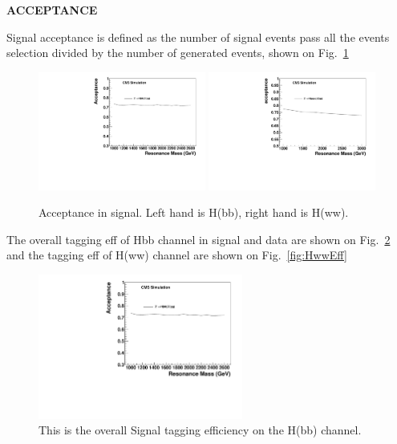 {\bf  ACCEPTANCE}

Signal acceptance is defined as the number of signal events pass all the events selection divided by the 
number of generated events, shown on Fig.~\ref{fig:Acc}

\begin{figure}[htb]
\begin{center}
\includegraphics[width=0.49\textwidth]{HbbZqqfigs/Signal/HbbZqq-signal-acc-8TeV.pdf}
\includegraphics[width=0.49\textwidth]{HqqqqZqqfigs/Signal/HqqqqZqq-signal-acc-8TeV.pdf}
\end{center}
\caption{
Acceptance in signal. Left hand is H(bb), right hand is H(ww).
}
\label{fig:Acc}
\end{figure}


The overall tagging eff of Hbb channel in signal and data are shown on Fig.~\ref{fig:HbbEff}
and the tagging eff of H(ww) channel are shown on Fig.~\ref{fig:HwwEff}


\begin{figure}[htb]
\begin{center}
\includegraphics[width=0.60\textwidth]{HbbZqqfigs/Signal/HbbZqq-signal-acc-8TeV.pdf}
\end{center}
\caption{
This is the overall Signal tagging efficiency on the H(bb) channel. 
}
\label{fig:HbbEff}
\end{figure}


